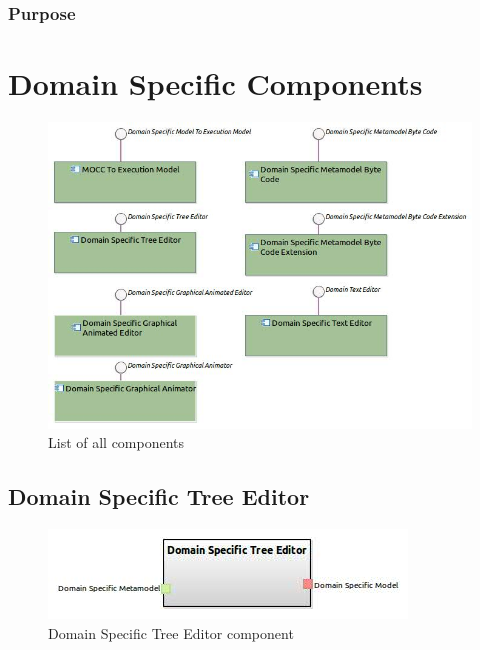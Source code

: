 \documentclass{gemoc} %
\begin{document}
\subsubsection{Purpose}



\section{Domain Specific Components}
\begin{figure}[bt]
	\begin{center}
	\includegraphics*[trim=0.0cm 0.0cm 0cm 0.0cm, clip=true, width=1.0\linewidth]{../images/DomainSpecificComponents.jpg}
	\caption{List of all components}
	\label{fig:DomainSpecificComponentList}
	\end{center}
\end{figure}
\subsection{Domain Specific Tree Editor}

\begin{figure}[htp]
	\begin{center}
	\includegraphics*[trim=0.0cm 0.0cm 0cm 0.0cm, clip=true, scale=1.0]{../images/generated/Generated_Domain Specific Tree Editor.jpg}
	\caption{Domain Specific Tree Editor component}
	\end{center}
\end{figure}
\end{document}

